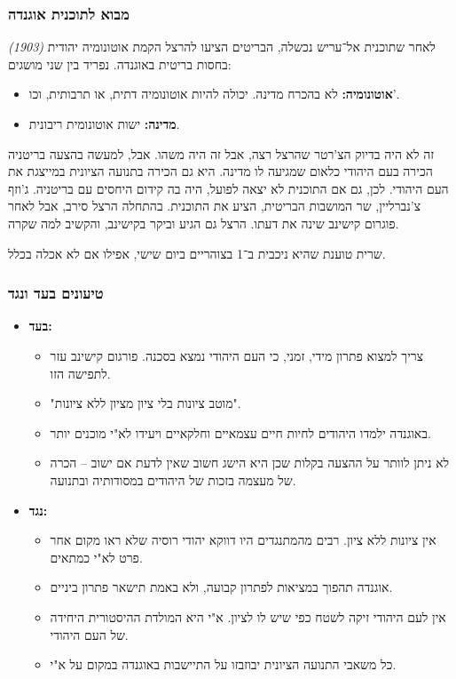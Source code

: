 \documentclass[a4paper]{book}
\begin{document}
	\subsubsection{מבוא לתוכנית אוגנדה}
	\textit{(1903)}	לאחר שתוכנית אל־עריש נכשלה, הבריטים הציעו להרצל הקמת אוטונומיה יהודית בחסות בריטית באוגנדה. נפריד בין שני מושגים: 
	\begin{itemize}
		\item \textbf{אוטונומיה: }לא בהכרח מדינה. יכולה להיות אוטונומיה דתית, או תרבותית, וכו'. 
		\item \textbf{מדינה: }ישות אוטונומית ריבונית. 
	\end{itemize}
	זה לא היה בדיוק הצ'רטר שהרצל רצה, אבל זה היה משהו. אבל, למעשה בהצעה בריטניה הכירה בעם היהודי כלאום שמגיעה לו מדינה. היא גם הכירה בתנועה הציונית במייצגת את העם היהודי. לכן, גם אם התוכנית לא יצאה לפועל, היה בה קידום היחסים עם בריטניה. ג'וזף צ'נברליין, שר המושבות הבריטית, הציע את התוכנית. בהתחלה הרצל סירב, אבל לאחר פוגרום קישינב שינה את דעתו. הרצל גם הגיע וביקר בקישינב, והקשיב למה שקרה. 
	
	שרית טוענת שהיא ניכבית ב־1 בצוהריים ביום שישי, אפילו אם לא אכלה בכלל. 
	
	\subsubsection{טיעונים בעד ונגד}
	\begin{itemize}
		\item \textbf{בעד: }
		\begin{itemize}
			\item צריך למצוא פתרון מידי, זמני, כי העם היהודי נמצא בסכנה. פורגום קישינב עזר לתפישה הזו. 
			\item "מוטב ציונות בלי ציון מציון ללא ציונות". 
			\item באוגנדה ילמדו היהודים לחיות חיים עצמאיים וחלקאיים ויעידו לא"י מוכנים יותר. 
			\item לא ניתן לוותר על ההצעה בקלות שכן היא הישג חשוב שאין לדעת אם ישוב – הכרה של מעצמה בזכות של היהודים במסודותיה ובתנועה. 
		\end{itemize}
		\item \textbf{נגד: }
		\begin{itemize}
			\item אין ציונות ללא ציון. רבים מהמתנגדים היו דווקא יהודי רוסיה שלא ראו מקום אחר פרט לא"י כמתאים. 
			\item אוגנדה תהפוך במציאות לפתרון קבועה, ולא באמת תישאר פתרון ביניים. 
			\item אין לעם היהודי זיקה לשטח כפי שיש לו לציון. א"י היא המולדת ההיסטורית היחידה של העם היהודי. 
			\item כל משאבי התנועה הציונית יבוזבזו על התיישבות באוגנדה במקום על א"י. 
		\end{itemize}
	\end{itemize}
	
\end{document}
